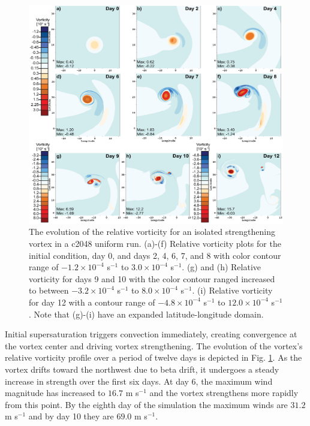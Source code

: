 \begin{figure}
    \centerline{%
    \noindent
    \includegraphics[width=\textwidth]{Chap2/c2048_vort_intime-01.eps}}
   \caption{The evolution of the relative vorticity for an isolated strengthening vortex in a c2048 uniform run.
   (a)-(f) Relative vorticity plots for the initial condition, day 0, and days 2, 4, 6, 7, and 8 with color contour
   range of $-1.2 \times 10^{-4}$ s$^{-1}$ to $3.0 \times 10^{-4}$ s$^{-1}$. (g) and (h) Relative 
   vorticity for days 9 and 10 with the color contour ranged increased to between 
   $-3.2 \times 10^{-4}$ s$^{-1}$ to $8.0 \times 10^{-4}$ s$^{-1}$. (i) Relative vorticity for
   day 12 with a contour range of $-4.8 \times 10^{-4}$ s$^{-1}$ to $12.0 \times 10^{-4}$ s$^{-1}$.
   Note that (g)-(i) have an expanded latitude-longitude domain.}%
    \label{fig:c2048_vortseries}
\end{figure}

    Initial supersaturation triggers convection immediately, 
    creating convergence at the vortex center and driving vortex strengthening.
   The evolution of the vortex's relative vorticity
   profile over a period of twelve days is depicted in Fig. \ref{fig:c2048_vortseries}.
   As the vortex drifts toward the northwest due to beta drift, 
   it undergoes a steady increase in strength over the first six days. 
   At day 6, the maximum wind magnitude has increased to $16.7$ m s$^{-1}$ and the vortex 
   strengthens more rapidly from this point. By the eighth day of the simulation the maximum winds 
   are $31.2$ m s$^{-1}$ and by day 10 they are $69.0$ m s$^{-1}$. 
   
